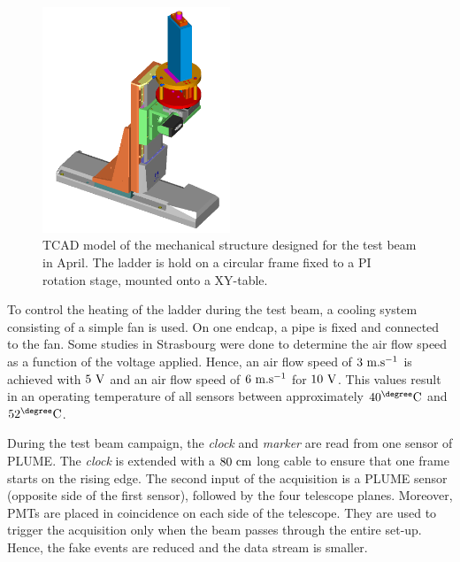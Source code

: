       \begin{figure}[!b]
        \centering
        \includegraphics[width = 0.5\textwidth]{Pictures/X0/Frame/Testbeam1.PNG}
        \caption{TCAD model of the mechanical structure designed for the test beam in April. The ladder is hold on a circular frame fixed to a PI rotation stage, mounted onto a XY-table.}
        \label{fig:mechanics}
      \end{figure}

      To control the heating of the ladder during the test beam, a cooling system consisting of a simple fan is used.
      On one endcap, a pipe is fixed and connected to the fan.
      Some studies in Strasbourg were done to determine the air flow speed as a function of the voltage applied.
      Hence, an air flow speed of $3~\rm{m.s^{-1}}$ is achieved with $5~\rm{V}$ and an air flow speed of $6~\rm{m.s^{-1}}$ for $10~\rm{V}$.
      This values result in an operating temperature of all sensors between approximately $40^{\degree}\rm{C}$ and $52^{\degree}\rm{C}$.

      During the test beam campaign, the \textit{clock} and \textit{marker} are read from one sensor of \gls{PLUME}.
      The \textit{clock} is extended with a $80~\rm{cm}$ long cable to ensure that one frame starts on the rising edge.
      The second input of the acquisition is a \gls{PLUME} sensor (opposite side of the first sensor), followed by the four telescope planes. 
      Moreover, \gls{PMT}s are placed in coincidence on each side of the telescope.
      They are used to trigger the acquisition only when the beam passes through the entire set-up.
      Hence, the fake events are reduced and the data stream is smaller.


